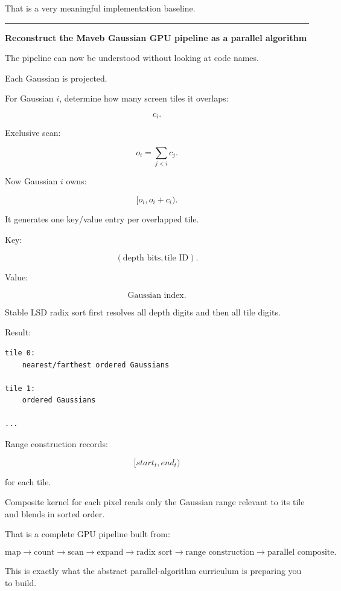 That is a very meaningful implementation baseline.

\begin{center}\rule{0.5\linewidth}{0.5pt}\end{center}

\textbf{Reconstruct the Maveb Gaussian GPU pipeline as a parallel algorithm}

The pipeline can now be understood without looking at code names.

Each Gaussian is projected.

For Gaussian \(i\), determine how many screen tiles it overlaps:

\[
c_i.
\]

Exclusive scan:

\[
o_i=
\sum_{j<i}c_j.
\]

Now Gaussian \(i\) owns:

\[
[o_i,o_i+c_i).
\]

It generates one key/value entry per overlapped tile.

Key:

\[
(\text{depth bits},\text{tile ID}).
\]

Value:

\[
\text{Gaussian index}.
\]

Stable LSD radix sort first resolves all depth digits and then all tile digits.

Result:

\protect{}\label{387b66}%
\begin{verbatim}
tile 0:
    nearest/farthest ordered Gaussians

tile 1:
    ordered Gaussians

...
\end{verbatim}

Range construction records:

\[
[start_t,end_t)
\]

for each tile.

Composite kernel for each pixel reads only the Gaussian range relevant to its tile and blends in sorted order.

That is a complete GPU pipeline built from:

\[
\boxed{
\text{map}
\rightarrow
\text{count}
\rightarrow
\text{scan}
\rightarrow
\text{expand}
\rightarrow
\text{radix sort}
\rightarrow
\text{range construction}
\rightarrow
\text{parallel composite}.
}
\]

This is exactly what the abstract parallel-algorithm curriculum is preparing you to build.


